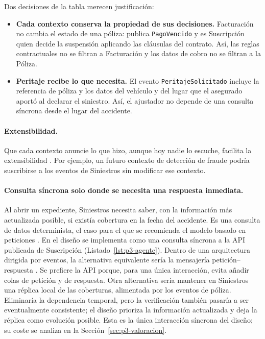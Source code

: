 Dos decisiones de la tabla merecen justificación:
\begin{itemize}
  \item \textbf{Cada contexto conserva la propiedad de sus decisiones.} Facturación no
        cambia el estado de una póliza: publica \texttt{PagoVencido} y es Suscripción
        quien decide la suspensión aplicando las cláusulas del contrato. Así, las reglas
        contractuales no se filtran a Facturación y los datos de cobro no se filtran a la
        Póliza.
  \item \textbf{Peritaje recibe lo que necesita.} El evento \texttt{PeritajeSolicitado}
        incluye la referencia de póliza y los datos del vehículo y del lugar que el
        asegurado aportó al declarar el siniestro. Así, el ajustador no depende de una
        consulta síncrona desde el lugar del accidente.
\end{itemize}

\paragraph{Extensibilidad.}
Que cada contexto anuncie lo que hizo, aunque hoy nadie lo escuche, facilita la
extensibilidad \parencite[cap.~14]{richardsford2020}. Por ejemplo, un futuro contexto de
detección de fraude podría suscribirse a los eventos de Siniestros sin modificar ese
contexto.

\paragraph{Consulta síncrona solo donde se necesita una respuesta inmediata.}
Al abrir un expediente, Siniestros necesita saber, con la información más actualizada
posible, si existía cobertura en la fecha del accidente. Es una consulta de datos determinista, el caso para el que se
recomienda el modelo basado en peticiones \parencite[cap.~14]{richardsford2020}. En el
diseño se implementa como una consulta síncrona a la API publicada de Suscripción
(Listado~\ref{lst:p3-agente}). Dentro de una arquitectura dirigida por eventos, la
alternativa equivalente sería la mensajería petición--respuesta
\parencite[cap.~14]{richardsford2020}. Se prefiere la API porque, para una única
interacción, evita añadir colas de petición y de respuesta. Otra alternativa sería
mantener en Siniestros una réplica local de las coberturas, alimentada por los eventos de
póliza. Eliminaría la dependencia temporal, pero la verificación también pasaría a ser
eventualmente consistente; el diseño prioriza la información actualizada y deja la réplica
como evolución posible. Esta es la única interacción síncrona del diseño;
su coste se analiza en la Sección~\ref{sec:p3-valoracion}.

